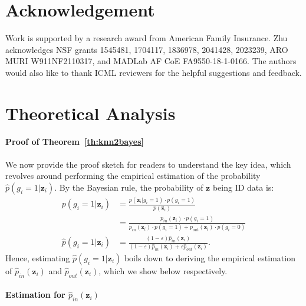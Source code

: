 \documentclass[nohyperref]{article}
\newcommand{\bz}{\mathbf{z}}
\theoremstyle{plain}
\theoremstyle{definition}
\theoremstyle{remark}
\begin{document}
\section*{Acknowledgement}
Work is supported by a research award from American Family Insurance. Zhu acknowledges NSF grants 1545481, 1704117, 1836978, 2041428, 2023239, ARO MURI W911NF2110317, and MADLab AF CoE FA9550-18-1-0166. The authors would also like to thank ICML reviewers for the helpful suggestions and feedback.






\newpage
\appendix
\onecolumn








\section{Theoretical Analysis}
\label{sup:theory}




\paragraph{Proof of Theorem~\ref{th:knn2bayes}} We now provide the proof sketch for readers to understand the key idea, which revolves around performing the empirical estimation of the probability $\hat{p}(g_i = 1|\bz_i)$. By the Bayesian rule, the probability of $\bz$ being ID data is:
\begin{align*}
     p(g_i = 1|\bz_i) &= 
     \frac{p(\bz_i| g_i = 1) \cdot p(g_i = 1)}{p(\bz_i)} \\ 
     &=\frac{p_{in}(\bz_i)\cdot p(g_i = 1)}
     {p_{in}(\bz_i)\cdot p(g_i = 1) + p_{out}(\bz_i)\cdot p(g_i = 0)} \\
    \hat{p}(g_i = 1|\bz_i) &=   \frac{(1-\varepsilon) \hat p_{in}(\bz_i)}{(1-\varepsilon){\hat p_{in}(\bz_i) + \varepsilon\hat p_{out}(\bz_i)}}.
\end{align*}
Hence, estimating $\hat p(g_i = 1|\bz_i)$ boils down to deriving the empirical estimation of $\hat p_{in}(\bz_i)$ and $\hat p_{out}(\bz_i)$, which we show below respectively.



\paragraph{Estimation for $\hat p_{in}(\bz_i)$}
\end{document}
